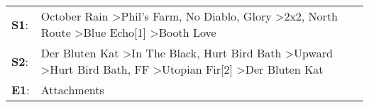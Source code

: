 \begin{supertabular}{p{0.03\textwidth}p{0.92\textwidth}}
 \textbf{S1}:  &                               October Rain\textsuperscript{} \textgreater \enspace Phil's Farm\textsuperscript{}, \enspace No Diablo\textsuperscript{}, \enspace Glory\textsuperscript{} \textgreater \enspace 2x2\textsuperscript{}, \enspace North Route\textsuperscript{} \textgreater \enspace Blue Echo[1]\textsuperscript{} \textgreater \enspace Booth Love\textsuperscript{}  \enspace  \\
 \textbf{S2}:  &  Der Bluten Kat\textsuperscript{} \textgreater \enspace In The Black\textsuperscript{}, \enspace Hurt Bird Bath\textsuperscript{} \textgreater \enspace Upward\textsuperscript{} \textgreater \enspace Hurt Bird Bath\textsuperscript{}, \enspace FF\textsuperscript{} \textgreater \enspace Utopian Fir[2]\textsuperscript{} \textgreater \enspace Der Bluten Kat\textsuperscript{}  \enspace  \\
 \textbf{E1}:  &                                                                                                                                                                                                                                                                                                                                                        Attachments\textsuperscript{}  \enspace  \\
\end{supertabular}

